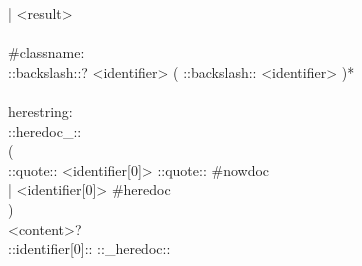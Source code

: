 \begin{bigbigpre}
  | <result> \\
 \\
#classname: \\
    ::backslash::? <identifier> ( ::backslash:: <identifier> )* \\
 \\
herestring: \\
    ::heredoc_:: \\
    ( \\
        ::quote:: <identifier[0]> ::quote:: #nowdoc \\
      | <identifier[0]>                     #heredoc \\
    ) \\
    <content>? \\
    ::identifier[0]:: ::_heredoc::
\end{bigbigpre}
